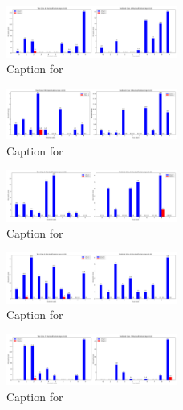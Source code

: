 \documentclass[12pt, a4paper]{article}
\begin{document}
\begin{figure}[ht]
\centering
\includegraphics[width=0.5\textwidth]{combined_class_boundary_pgd/combined_class_4_misclassifications_eps_0.03.png}
\caption{Caption for }
\label{fig:combined_class_4_misclassifications_eps_0.03.png}
\end{figure}

\begin{figure}[ht]
\centering
\includegraphics[width=0.5\textwidth]{combined_class_boundary_pgd/combined_class_5_misclassifications_eps_0.03.png}
\caption{Caption for }
\label{fig:combined_class_5_misclassifications_eps_0.03.png}
\end{figure}

\begin{figure}[ht]
\centering
\includegraphics[width=0.5\textwidth]{combined_class_boundary_pgd/combined_class_6_misclassifications_eps_0.03.png}
\caption{Caption for }
\label{fig:combined_class_6_misclassifications_eps_0.03.png}
\end{figure}

\begin{figure}[ht]
\centering
\includegraphics[width=0.5\textwidth]{combined_class_boundary_pgd/combined_class_8_misclassifications_eps_0.03.png}
\caption{Caption for }
\label{fig:combined_class_8_misclassifications_eps_0.03.png}
\end{figure}

\begin{figure}[ht]
\centering
\includegraphics[width=0.5\textwidth]{combined_class_boundary_pgd/combined_class_7_misclassifications_eps_0.03.png}
\caption{Caption for }
\label{fig:combined_class_7_misclassifications_eps_0.03.png}
\end{figure}
\end{document}

